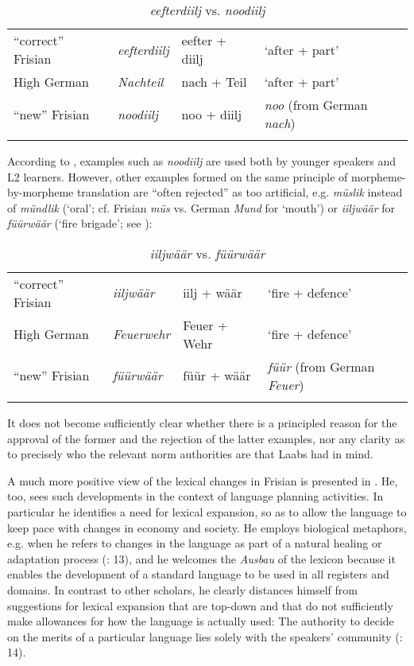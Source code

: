 \documentclass[output=paper]{langsci/langscibook}
\begin{document}
\begin{table}
\begin{tabularx}{\textwidth}{lXXl}
\lsptoprule
{“correct” Frisian} & \textit{eefterdiilj} & eefter + diilj & ‘after + part’\\
{High German} & \textit{Nachteil} & nach + Teil & ‘after + part’\\
{“new” Frisian} & \textit{noodiilj} & noo + diilj & \textit{noo} (from German \textit{nach})\\
\lspbottomrule
\end{tabularx}
\caption{\textit{eefterdiilj} vs. \textit{noodiilj}}
\label{tab:gregersen:1}
\end{table}

According to \citet[38]{Laabs2009}, examples such as \textit{noodiilj} are used both by younger speakers and L2 learners. However, other examples formed on the same principle of morpheme-by-morpheme translation are “often rejected” as too artificial, e.g. \textit{müslik} instead of \textit{mündlik} (‘oral’; cf. Frisian \textit{müs} vs. German \textit{Mund} for ‘mouth’) or \textit{iiljwäär} for \textit{füürwäär} (‘fire brigade’; see ): 

\begin{table}
\begin{tabularx}{\textwidth}{lXXl}
\lsptoprule
“correct” Frisian & \textit{iiljwäär} & iilj + wäär & ‘fire + defence’\\
High German & \textit{Feuerwehr} & Feuer + Wehr & ‘fire + defence’\\
“new” Frisian & \textit{füürwäär} & füür + wäär & \textit{füür} (from German \textit{Feuer})\\
\lspbottomrule
\end{tabularx}
\caption{\textit{iiljwäär} vs. \textit{füürwäär}}
\label{tab:gregersen:2}
\end{table}

It does not become sufficiently clear whether there is a principled reason for the approval of the former and the rejection of the latter examples, nor any clarity as to precisely who the relevant norm authorities are that Laabs had in mind.

A much more positive view of the lexical changes in Frisian is presented in \citet{Arhammar1999}. He, too, sees such developments in the context of language planning activities. In particular he identifies a need for lexical expansion, so as to allow the language to keep pace with changes in economy and society. He employs biological metaphors, e.g. when he refers to changes in the language as part of a natural healing or adaptation process (\citealt{Arhammar1999}: 13), and he welcomes the \textit{Ausbau} of the lexicon because it enables the development of a standard language to be used in all registers and domains. In contrast to other scholars, he clearly distances himself from suggestions for lexical expansion that are top-down and that do not sufficiently make allowances for how the language is actually used: The authority to decide on the merits of a particular language lies solely with the speakers’ community (\citealt{Arhammar1999}: 14).
\end{document}
